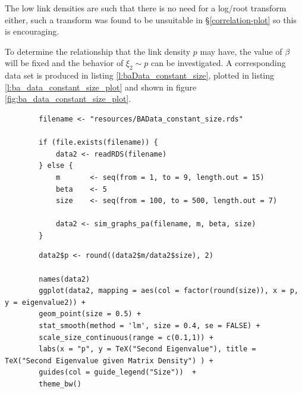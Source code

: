 \documentclass[11pt, twoside]{report}
\begin{document}
The low link densities are such that there is no need for a log/root transform either, such a transform was found to be unsuitable in \S \ref{correlation-plot} so this is encouraging.

To determine the relationship that the link density \(p\) may have, the value of
\(\beta\) will be fixed and the behavior of \(\xi_{2} \sim p\) can be
investigated. A corresponding data set is produced in listing
\ref{l:baData_constant_size}, plotted in listing \ref{l:ba_data_constant_size_plot} and
shown in figure \ref{fig:ba_data_constant_size_plot}.



\begin{listing}[htbp]
    \begin{tcolorbox}
        \begin{verbatim}
        filename <- "resources/BAData_constant_size.rds"

        if (file.exists(filename)) {
            data2 <- readRDS(filename)
        } else {
            m       <- seq(from = 1, to = 9, length.out = 15)
            beta    <- 5
            size    <- seq(from = 100, to = 500, length.out = 7)

            data2 <- sim_graphs_pa(filename, m, beta, size)
        }
        \end{verbatim}
    \end{tcolorbox}
\caption{\label{l:baData_constant_size}l:baData\textsubscript{constant}\textsubscript{size}}
\end{listing}

\begin{listing}[htbp]
    \begin{tcolorbox}
        \begin{verbatim}
        data2$p <- round((data2$m/data2$size), 2)

        names(data2)
        ggplot(data2, mapping = aes(col = factor(round(size)), x = p, y = eigenvalue2)) +
        geom_point(size = 0.5) +
        stat_smooth(method = 'lm', size = 0.4, se = FALSE) +
        scale_size_continuous(range = c(0.1,1)) +
        labs(x = "p", y = TeX("Second Eigenvalue"), title = TeX("Second Eigenvalue given Matrix Density") ) +
        guides(col = guide_legend("Size"))  +
        theme_bw()
        \end{verbatim}
    \end{tcolorbox}
\caption{\label{l:ba_data_constant_size_plot}l:ba\textsubscript{data}\textsubscript{constant}\textsubscript{size}\textsubscript{plot}}
\end{listing}
\end{document}
